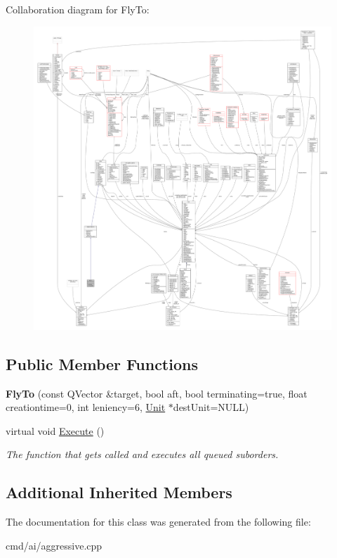 Collaboration diagram for Fly\+To\+:
\nopagebreak
\begin{figure}[H]
\begin{center}
\leavevmode
\includegraphics[width=350pt]{d4/d3f/classFlyTo__coll__graph}
\end{center}
\end{figure}
\subsection*{Public Member Functions}
\begin{DoxyCompactItemize}
\item 
{\bfseries Fly\+To} (const Q\+Vector \&target, bool aft, bool terminating=true, float creationtime=0, int leniency=6, \hyperlink{classUnit}{Unit} $\ast$dest\+Unit=N\+U\+LL)\hypertarget{classFlyTo_aaccce9f52a903b3f859942b70532cb36}{}\label{classFlyTo_aaccce9f52a903b3f859942b70532cb36}

\item 
virtual void \hyperlink{classFlyTo_a35f877de5b2677cefeee567f06816ec3}{Execute} ()\hypertarget{classFlyTo_a35f877de5b2677cefeee567f06816ec3}{}\label{classFlyTo_a35f877de5b2677cefeee567f06816ec3}

\begin{DoxyCompactList}\small\item\em The function that gets called and executes all queued suborders. \end{DoxyCompactList}\end{DoxyCompactItemize}
\subsection*{Additional Inherited Members}


The documentation for this class was generated from the following file\+:\begin{DoxyCompactItemize}
\item 
cmd/ai/aggressive.\+cpp\end{DoxyCompactItemize}
